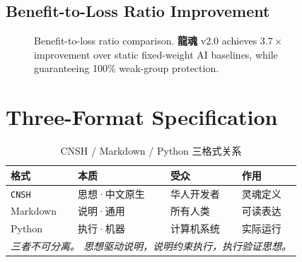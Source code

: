 \documentclass[conference]{IEEEtran}
\newcommand{\LH}{\textcolor{dragonRed}{\textbf{龍魂}}}
\newcommand{\CNSH}{\texttt{\textcolor{dnaBlue}{CNSH}}}
\begin{document}
\subsection{Benefit-to-Loss Ratio Improvement}

\begin{figure}[t]
\centering
{}
\caption{Benefit-to-loss ratio comparison.
  \LH{} v2.0 achieves $3.7\times$ improvement over
  static fixed-weight AI baselines,
  while guaranteeing 100\% weak-group protection.}
\label{fig:eval-bar}
\end{figure}

\section{Three-Format Specification}
\label{sec:formats}

\begin{table}[t]
\centering
\caption{CNSH / Markdown / Python 三格式关系}
\label{tab:formats}
\renewcommand{\arraystretch}{1.2}
\begin{tabular}{llll}
\toprule
\textbf{格式} & \textbf{本质}
  & \textbf{受众} & \textbf{作用} \\
\midrule
\CNSH{} & 思想·中文原生
  & 华人开发者 & 灵魂定义 \\
Markdown & 说明·通用
  & 所有人类 & 可读表达 \\
Python & 执行·机器
  & 计算机系统 & 实际运行 \\
\midrule
\multicolumn{4}{l}{%
  \textit{三者不可分离。
    思想驱动说明，说明约束执行，执行验证思想。}} \\
\bottomrule
\end{tabular}
\end{table}
\end{document}
